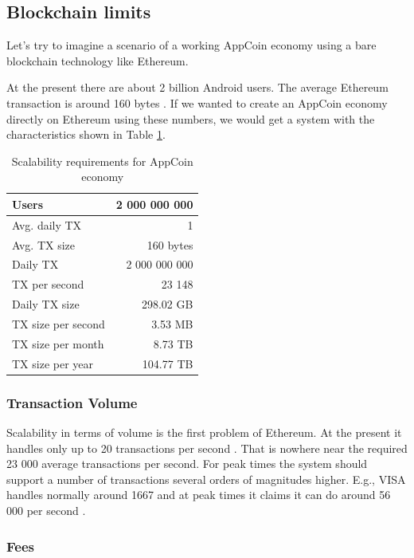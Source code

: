 \subsection{Blockchain limits}


Let's try to imagine a scenario of a working AppCoin economy using a bare blockchain technology like Ethereum.

At the present there are about 2 billion Android users. The average Ethereum transaction is around 160 bytes \cite{EthereumTransactions}. If we wanted to create an AppCoin economy directly on Ethereum using these numbers, we would get a system with the characteristics shown in Table \ref{table:ethereumscalability}.

\begin{table}[!htbp]
\centering
\begin{tabular}{|l|r|}
\hline
Users              & 2 000 000 000    \\ \hline
Avg. daily TX      & 1                \\ \hline
Avg. TX size       & 160 bytes        \\ \hline
Daily TX           & 2 000 000 000    \\ \hline
TX per second      & 23 148           \\ \hline
Daily TX size      & 298.02 GB        \\ \hline
TX size per second & 3.53 MB          \\ \hline
TX size per month  & 8.73 TB          \\ \hline
TX size per year   & 104.77 TB        \\ \hline
\end{tabular}
\caption{Scalability requirements for AppCoin economy}
\label{table:ethereumscalability}
\end{table}


\subsubsection{Transaction Volume}
Scalability in terms of volume is the first problem of Ethereum. At the present it handles only up to 20 transactions per second \cite{eth_scaling}. That is nowhere near the required 23 000 average transactions per second. For peak times the system should support a number of transactions several orders of magnitudes higher. E.g., VISA handles normally around 1667 and at peak times it claims it can do around 56 000 per second \cite{eth_scaling}.

\subsubsection{Fees}

